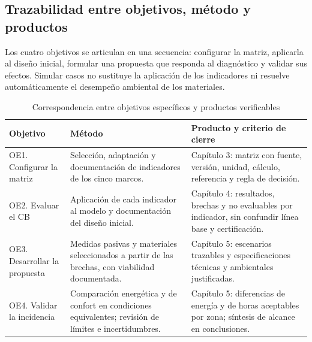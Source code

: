 \par\medskip
\subsection{Trazabilidad entre objetivos, método y productos}
\label{sec:trazabilidad-objetivos}
Los cuatro objetivos se articulan en una secuencia: configurar la matriz, aplicarla al diseño inicial, formular una propuesta que responda al diagnóstico y validar sus efectos. Simular casos no sustituye la aplicación de los indicadores ni resuelve automáticamente el desempeño ambiental de los materiales.

\begin{table}[H]\centering
\caption{Correspondencia entre objetivos específicos y productos verificables}
{\small\singlespacing\renewcommand{\arraystretch}{1.35}\setlength{\tabcolsep}{4pt}
\begin{tabular}{>{\raggedright\arraybackslash}p{2.6cm}>{\raggedright\arraybackslash}p{5.6cm}>{\raggedright\arraybackslash}p{5.8cm}}\toprule
Objetivo & Método & Producto y criterio de cierre \\ \midrule
OE1. Configurar la matriz & Selección, adaptación y documentación de indicadores de los cinco marcos. & Capítulo 3: matriz con fuente, versión, unidad, cálculo, referencia y regla de decisión. \\
OE2. Evaluar el CB & Aplicación de cada indicador al modelo y documentación del diseño inicial. & Capítulo 4: resultados, brechas y no evaluables por indicador, sin confundir línea base y certificación. \\
OE3. Desarrollar la propuesta & Medidas pasivas y materiales seleccionados a partir de las brechas, con viabilidad documentada. & Capítulo 5: escenarios trazables y especificaciones técnicas y ambientales justificadas. \\
OE4. Validar la incidencia & Comparación energética y de confort en condiciones equivalentes; revisión de límites e incertidumbres. & Capítulo 5: diferencias de energía y de horas aceptables por zona; síntesis de alcance en conclusiones. \\
\bottomrule\end{tabular}}
\end{table}
